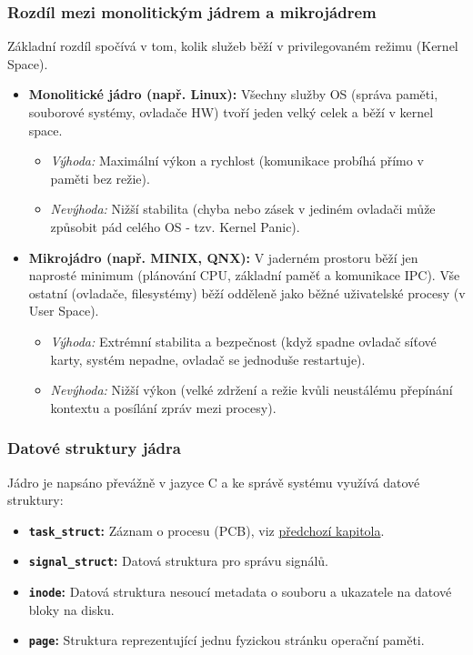 \subsubsection*{Rozdíl mezi monolitickým jádrem a mikrojádrem}
Základní rozdíl spočívá v tom, kolik služeb běží v privilegovaném režimu (Kernel Space).

\begin{itemize}
    \item \textbf{Monolitické jádro (např. Linux):} Všechny služby OS (správa paměti, souborové systémy, ovladače HW) tvoří jeden velký celek a běží v kernel space.
    \begin{itemize}
        \item \textit{Výhoda:} Maximální výkon a rychlost (komunikace probíhá přímo v paměti bez režie).
        \item \textit{Nevýhoda:} Nižší stabilita (chyba nebo zásek v jediném ovladači může způsobit pád celého OS - tzv. Kernel Panic).
    \end{itemize}
    
    \item \textbf{Mikrojádro (např. MINIX, QNX):} V jaderném prostoru běží jen naprosté minimum (plánování CPU, základní paměť a komunikace IPC). Vše ostatní (ovladače, filesystémy) běží odděleně jako běžné uživatelské procesy (v User Space).
    \begin{itemize}
        \item \textit{Výhoda:} Extrémní stabilita a bezpečnost (když spadne ovladač síťové karty, systém nepadne, ovladač se jednoduše restartuje).
        \item \textit{Nevýhoda:} Nižší výkon (velké zdržení a režie kvůli neustálému přepínání kontextu a posílání zpráv mezi procesy).
    \end{itemize}
\end{itemize}

\subsubsection*{Datové struktury jádra}
\label{prg:datastructs}
Jádro je napsáno převážně v jazyce C a ke správě systému využívá datové struktury:
\begin{itemize}
    \item \textbf{\texttt{task\_struct}:} Záznam o procesu (PCB), viz \hyperref[prg:taskstruct]{předchozí kapitola}.
    \item \textbf{\texttt{signal\_struct}:} Datová struktura pro správu signálů.
    \item \textbf{\texttt{inode}:} Datová struktura nesoucí metadata o souboru a ukazatele na datové bloky na disku.
    \item \textbf{\texttt{page}:} Struktura reprezentující jednu fyzickou stránku operační paměti.
\end{itemize}

